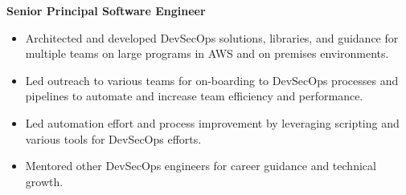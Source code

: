 \documentclass[12pt, line, margin]{res}
\begin{document}
\begin{resume}
            \textbf{Senior Principal Software Engineer}
            \begin{itemize}  \itemsep -2pt %
              \item   Architected and developed DevSecOps solutions, libraries,
                          and guidance for multiple teams on large programs
                          in AWS and on premises environments.
              \item   Led outreach to various teams for on-boarding to DevSecOps \newline
                          processes and pipelines to automate and increase team efficiency
                          and performance.
              \item   Led automation effort and process improvement by leveraging
                          scripting and various tools for DevSecOps efforts.
              \item   Mentored other DevSecOps engineers for career guidance and
                          technical growth.
            \end{itemize}



\end{resume}
\end{document}
